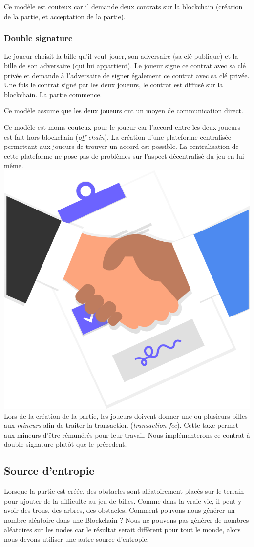 \documentclass{article}
\begin{document}
Ce modèle est couteux car il demande deux contrats sur la blockchain (création de la partie, et acceptation de la partie).


\subsubsection{Double signature}
Le joueur choisit la bille qu'il veut jouer, son adversaire (sa clé publique) et la bille de son adversaire (qui lui appartient). Le joueur signe ce contrat avec sa clé privée et demande à l'adversaire de signer également ce contrat avec sa clé privée. Une fois le contrat signé par les deux joueurs, le contrat est diffusé sur la blockchain. La partie commence.

Ce modèle assume que les deux joueurs ont un moyen de communication direct.

Ce modèle est moins couteux pour le joueur car l'accord entre les deux joueurs est fait hors-blockchain (\textit{off-chain}).
La création d'une plateforme centralisée permettant aux joueurs de trouver un accord est possible. La centralisation de cette plateforme ne pose pas de problèmes sur l'aspect décentralisé du jeu en lui-même.\\


\includegraphics[width=0.3\linewidth]{assets/agreement.png}\\

Lors de la création de la partie, les joueurs doivent donner une ou plusieurs billes aux \textit{mineurs} afin de traiter la transaction (\textit{transaction fee}). Cette taxe permet aux mineurs d'être rémunérés pour leur travail. Nous implémenterons ce contrat à double signature plutôt que le précedent.


\subsection{Source d'entropie}
Lorsque la partie est créée, des obstacles sont aléatoirement placés sur le terrain pour ajouter de la difficulté au jeu de billes. Comme dans la vraie vie, il peut y avoir des trous, des arbres, des obstacles. Comment pouvons-nous générer un nombre aléatoire dans une Blockchain ?
Nous ne pouvons-pas générer de nombres aléatoires sur les nodes car le résultat serait différent pour tout le monde, alors nous devons utiliser une autre source d'entropie.
\end{document}
